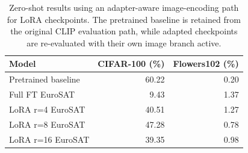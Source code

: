\begin{table}[t]
\centering
\caption{Zero-shot results using an adapter-aware image-encoding path for LoRA checkpoints. The pretrained baseline is retained from the original CLIP evaluation path, while adapted checkpoints are re-evaluated with their own image branch active.}
\label{tab:zeroshot}
\small
\begin{tabular}{lrr}
\toprule
Model & CIFAR-100 (\%) & Flowers102 (\%) \\
\midrule
Pretrained baseline & 60.22 & 0.20 \\
Full FT EuroSAT & 9.43 & 1.37 \\
LoRA r=4 EuroSAT & 40.51 & 1.27 \\
LoRA r=8 EuroSAT & 47.28 & 0.78 \\
LoRA r=16 EuroSAT & 39.35 & 0.98 \\
\bottomrule
\end{tabular}
\end{table}
